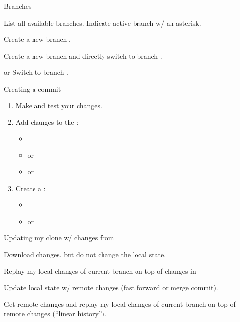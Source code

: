 \begin{frame}{Branches}
\begin{block}{}
List all available branches. Indicate active branch w/ an asterisk.
\end{block}
\begin{block}{}
Create a new branch .
\end{block}
\begin{block}{}
Create a new branch  and directly switch to branch .
\end{block}
\begin{block}{ or }
Switch to branch .
\end{block}
\end{frame}

\begin{frame}{Creating a commit}
\begin{enumerate}
\item Make and test your changes.
\item Add changes to the :
\begin{itemize}
\item {}
\item {} or 
\item {} or 
\end{itemize}
\item Create a :
\begin{itemize}
\item {}
\item {} or 
\end{itemize}
\end{enumerate}
\end{frame}

\begin{frame}{Updating my clone w/ changes from }
\begin{block}{}
Download changes, but do not change the local state.
\end{block}
\begin{block}{}
Replay my local changes of current branch on top of changes in 
\end{block}
\begin{block}{}
Update local state w/ remote changes (fast forward or merge commit).
\end{block}
\begin{block}{}
Get remote changes and replay my local changes of current branch on top of remote changes (``linear history'').
\end{block}
\end{frame}

